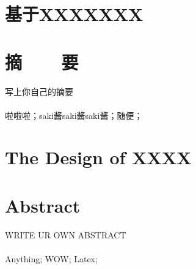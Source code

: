 \section*{\heiti 基于XXXXXXX}
\section*{\heiti 摘\ \ \ \  要}

写上你自己的摘要
\\
\\
啦啦啦；saki酱saki酱saki酱；随便；

\clearpage


\section*{\bfseries The Design of XXXX}



\section*{\bfseries Abstract}

WRITE UR OWN ABSTRACT
	\\
	\\
	Anything; WOW; Latex;

\clearpage




